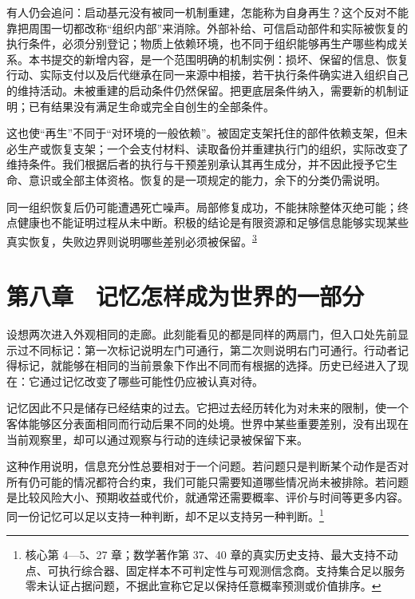\documentclass[
  11pt,
  oneside]{book}
\begin{document}
有人仍会追问：启动基元没有被同一机制重建，怎能称为自身再生？这个反对不能靠把周围一切都改称``组织内部''来消除。外部补给、可信启动部件和实际被恢复的执行条件，必须分别登记；物质上依赖环境，也不同于组织能够再生产哪些构成关系。本书提交的新增内容，是一个范围明确的机制实例：损坏、保留的信息、恢复行动、实际支付以及后代继承在同一来源中相接，若干执行条件确实进入组织自己的维持活动。未被重建的启动条件仍然保留。把更底层条件纳入，需要新的机制证明；已有结果没有满足生命或完全自创生的全部条件。

这也使``再生''不同于``对环境的一般依赖''。被固定支架托住的部件依赖支架，但未必生产或恢复支架；一个会支付材料、读取备份并重建执行门的组织，实际改变了维持条件。我们根据后者的执行与干预差别承认其再生成分，并不因此授予它生命、意识或全部主体资格。恢复的是一项规定的能力，余下的分类仍需说明。

\begingroup{}

同一组织恢复后仍可能遭遇死亡噪声。局部修复成功，不能抹除整体灭绝可能；终点健康也不能证明过程从未中断。积极的结论是有限资源和足够信息能够实现某些真实恢复，失败边界则说明哪些差别必须被保留。\textsuperscript{\hyperlink{ph-note-3}{3}}

\par\endgroup

\chapter{第八章　记忆怎样成为世界的一部分}\label{ph-ch-08}

设想两次进入外观相同的走廊。此刻能看见的都是同样的两扇门，但入口处先前显示过不同标记：第一次标记说明左门可通行，第二次则说明右门可通行。行动者记得标记，就能够在相同的当前景象下作出不同而有根据的选择。历史已经进入了现在：它通过记忆改变了哪些可能性仍应被认真对待。

记忆因此不只是储存已经结束的过去。它把过去经历转化为对未来的限制，使一个客体能够区分表面相同而行动后果不同的处境。世界中某些重要差别，没有出现在当前观察里，却可以通过观察与行动的连续记录被保留下来。

这种作用说明，信息充分性总要相对于一个问题。若问题只是判断某个动作是否对所有仍可能的情况都符合约束，我们可能只需要知道哪些情况尚未被排除。若问题是比较风险大小、预期收益或代价，就通常还需要概率、评价与时间等更多内容。同一份记忆可以足以支持一种判断，却不足以支持另一种判断。\footnote{\hypertarget{ph-note-20}{}核心第 4---5、27 章；数学著作第 37、40 章的真实历史支持、最大支持不动点、可执行综合器、固定样本不可判定性与可观测信念商。支持集合足以服务零未认证占据问题，不据此宣称它足以保持任意概率预测或价值排序。}
\end{document}
